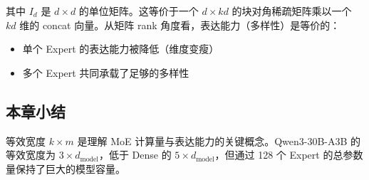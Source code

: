 其中 $I_d$ 是 $d \times d$ 的单位矩阵。这等价于一个 $d \times kd$ 的块对角稀疏矩阵乘以一个 $kd$ 维的 concat 向量。从矩阵 rank 角度看，表达能力（多样性）是等价的：
\begin{itemize}
  \item 单个 Expert 的表达能力被降低（维度变瘦）
  \item 多个 Expert 共同承载了足够的多样性
\end{itemize}

\subsection{本章小结}

等效宽度 $k \times m$ 是理解 MoE 计算量与表达能力的关键概念。Qwen3-30B-A3B 的等效宽度为 $3 \times d_{\text{model}}$，低于 Dense 的 $5 \times d_{\text{model}}$，但通过 128 个 Expert 的总参数量保持了巨大的模型容量。

